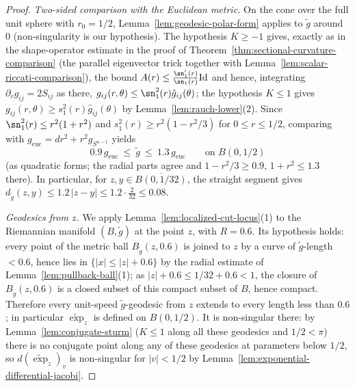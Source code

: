 \begin{proof}
\sketch
{}
\emph{Two-sided comparison with the Euclidean metric.} On the cone
over the full unit sphere with $r_0=1/2$,
Lemma~\ref{lem:geodesic-polar-form} applies to $\tilde g$ around
$0$ (non-singularity is our hypothesis). The hypothesis $K\ge-1$
gives, exactly as in the shape-operator estimate in the proof of
Theorem~\ref{thm:sectional-curvature-comparison} (the parallel
eigenvector trick together with
Lemma~\ref{lem:scalar-riccati-comparison}), the bound $A(r)\le
\frac{\sn_1'(r)}{\sn_1(r)}\mathrm{Id}$ and hence, integrating
$\partial_rg_{ij}=2S_{ij}$ as there,
$g_{ij}(r,\theta)\le\sn_1^2(r)\hat g_{ij}(\theta)$; the hypothesis
$K\le1$ gives $g_{ij}(r,\theta)\ge s_1^2(r)\hat g_{ij}(\theta)$ by
Lemma~\ref{lem:rauch-lower}(2). Since
$\sn_1^2(r)\le r^2(1+r^2)$ and $s_1^2(r)\ge r^2(1-r^2/3)$ for
$0\le r\le 1/2$, comparing with
$g_{\mathrm{euc}}=dr^2+r^2g_{S^{n-1}}$ yields
\begin{equation}\label{twosided}
0.9\,g_{\mathrm{euc}}\ \le\ \tilde g\ \le\ 1.3\,g_{\mathrm{euc}}
\qquad\text{on }B(0,1/2)
\end{equation}
(as quadratic forms; the radial parts agree and
$1-r^2/3\ge0.9$, $1+r^2\le1.3$ there). In particular, for
$z,y\in\overline{B(0,1/32)}$, the straight segment gives
$d_{\tilde g}(z,y)\le1.2\,|z-y|\le1.2\cdot\tfrac{2}{32}\le0.08$.

\emph{Geodesics from $z$.} We apply
Lemma~\ref{lem:localized-cut-locus}(1) to the Riemannian manifold
$(B,\tilde g)$ at the point $z$, with $R=0.6$. Its hypothesis
holds: every point of the metric ball $B_{\tilde g}(z,0.6)$ is
joined to $z$ by a curve of $\tilde g$-length $<0.6$, hence lies
in $\{|x|\le|z|+0.6\}$ by the radial estimate of
Lemma~\ref{lem:pullback-ball}(1); as $|z|+0.6\le1/32+0.6<1$, the
closure of $B_{\tilde g}(z,0.6)$ is a closed subset of this
compact subset of $B$, hence compact. Therefore every unit-speed
$\tilde g$-geodesic from $z$ extends to every length less than
$0.6$; in particular $\widetilde\exp_z$ is defined on $B(0,1/2)$.
It is non-singular there: by Lemma~\ref{lem:conjugate-sturm}
($K\le1$ along all these geodesics and $1/2<\pi$) there is no
conjugate point along any of these geodesics at parameters
below $1/2$, so $d(\widetilde\exp_z)_v$ is non-singular for
$|v|<1/2$ by Lemma~\ref{lem:exponential-differential-jacobi}.


\end{proof}
